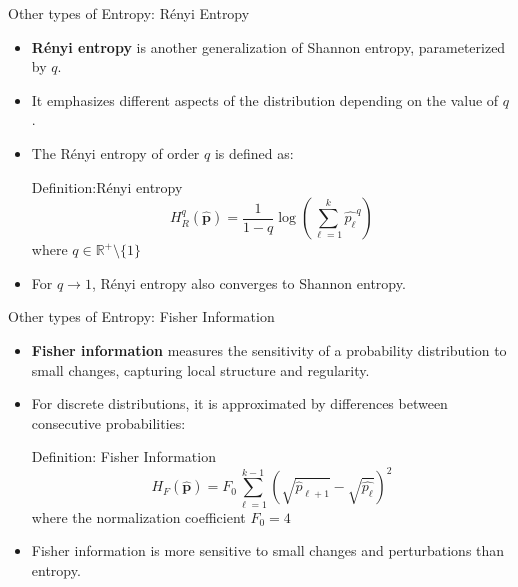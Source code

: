 \documentclass{beamer}
\begin{document}
\begin{frame}{Other types of Entropy: Rényi Entropy}
	\begin{itemize}
		\item \textbf{Rényi entropy} is another generalization of Shannon entropy, parameterized by $q$.
		\item It emphasizes different aspects of the distribution depending on the value of $q$.
		\item The Rényi entropy of order $q$ is defined as:
		\begin{block}{Definition:Rényi entropy }
			\[
			H_{R}^{q}(\widehat{\mathbf{p}}) = \frac{1}{1-q} \log \left( \sum_{\ell=1}^{k} \widehat{p_\ell}^q \right)
			\]
			where $q \in \mathbb{R}^+ \setminus \{1\}$
		\end{block}
		\item For $q \to 1$, Rényi entropy also converges to Shannon entropy.
	\end{itemize}
\end{frame}

\begin{frame}{Other types of Entropy: Fisher Information}
	\begin{itemize}
		\item \textbf{Fisher information} measures the sensitivity of a probability distribution to small changes, capturing local structure and regularity.
		\item For discrete distributions, it is approximated by differences between consecutive probabilities:
		\begin{block}{Definition: Fisher Information}
			\[
			H_F(\widehat{\mathbf{p}}) = F_0 \sum_{\ell=1}^{k-1} \left( \sqrt{{\widehat{p}_{\ell+1}}} - \sqrt{\widehat{p_\ell}} \right)^2
			\]
			where the normalization coefficient $F_0 = 4$
		\end{block}
		\item Fisher information is more sensitive to small changes and perturbations than entropy.
	\end{itemize}
\end{frame}



\end{document}
